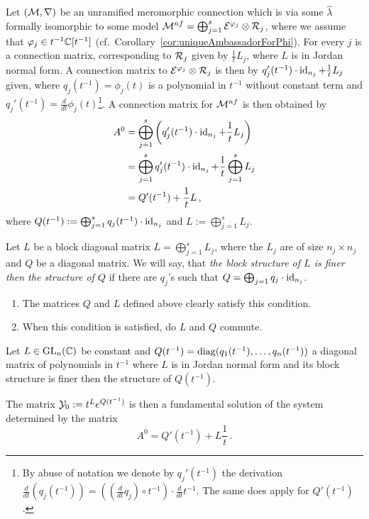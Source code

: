 Let $(\mathcal{M},\nabla)$ be an unramified meromorphic connection which is via some
$\hat\lambda$ formally isomorphic to some model
$\mathcal{M}^{nf}=\bigoplus_{j=1}^s\mathcal{E}^{\varphi_j}\otimes\mathcal{R}_j$, where we assume that
$\varphi_j\in t^{-1}\mathbb{C}[t^{-1}]$ (cf.~Corollary~\ref{cor:uniqueAmbassadorForPhi}).
For every $j$ is a connection matrix, corresponding to $\mathcal{R}_j$ given by
$\frac{1}{t}L_j$, where $L$ is in Jordan normal form.
A connection matrix to $\mathcal{E}^{\varphi_j}\otimes\mathcal{R}_j$ is then by
$q_j'(t^{-1})\cdot\operatorname{id}_{n_j}+\frac{1}{t}L_j$ given\TODO[(cf.~???)], where
$q_j(t^{-1})=\phi_j(t)$ is a polynomial in $t^{-1}$ without constant term and
$q_j'(t^{-1})=\frac{d}{dt}\phi_j(t)$\footnote{By abuse of notation we denote by
  $q_j'(t^{-1})$ the derivation $\frac{d}{dt}(q_j(t^{-1}))=
  \left(\left(\frac{d}{dt}q_j\right)\circ t^{-1}\right) \cdot\frac{d}{dt}t^{-1}$.
  The same does apply for $Q'(t^{-1})$.}.
A connection matrix for $\mathcal{M}^{nf}$ is then obtained by
\begin{align*}
  A^0&= \bigoplus_{j=1}^s
       \left(q_j'(t^{-1})\cdot\operatorname{id}_{n_j}+\frac{1}{t}L_j\right)
  \\ &=\bigoplus_{j=1}^sq_j'(t^{-1})\cdot\operatorname{id}_{n_j}
       +\frac{1}{t}\bigoplus_{j=1}^sL_j
  \\ &=Q'(t^{-1})+\frac{1}{t}L \,,
\end{align*}
where
$Q(t^{-1}):=\bigoplus_{j=1}^sq_j(t^{-1})\cdot\operatorname{id}_{n_j}$
and $L:=\bigoplus_{j=1}^sL_j$.
\begin{defn}\label{defn:structureComparison}
  Let $L$ be a block diagonal matrix $L=\bigoplus_{j=1}^sL_j$, where the $L_j$
  are of size $n_j\times n_j$ and $Q$ be a diagonal matrix.
  We will say, that \emph{the block structure of $L$ is finer then the
  structure of $Q$} if there are $q_j$'s such that
  $Q=\bigoplus_{j=1}q_j\cdot\operatorname{id}_{n_j}$.
  \begin{s-rem}
    \begin{enumerate}\label{rem:structureComparison}
      \item The matrices $Q$ and $L$ defined above clearly satisfy this
        condition.
      \item When this condition is satisfied, do $L$ and $Q$ commute.
    \end{enumerate}
  \end{s-rem}
\end{defn}
\begin{prop}\label{prop:fundSolBuilder}
  Let $L\in \operatorname{GL}_n(\mathbb{C})$ be constant and
  $Q(t^{-1})=\operatorname{diag}(q_1(t^{-1}),\dots,q_n(t^{-1}))$ a diagonal matrix of
  polynomials in $t^{-1}$ where $L$ is in Jordan normal form and its block
  structure is finer then the structure of $Q(t^{-1})$.

  The matrix $\mathcal{Y}_0:=t^L e^{Q(t^{-1})}$ is then a fundamental solution of the
  system determined by the matrix
  \[
    A^0=Q'(t^{-1})+L\frac{1}{t} \,.
  \]
\end{prop}
